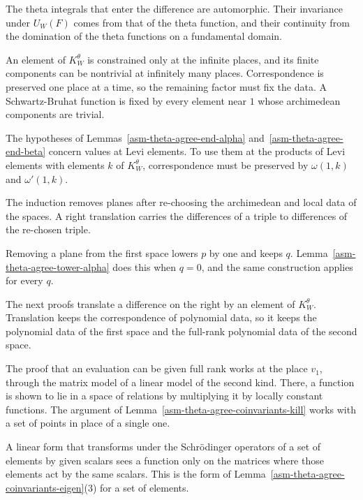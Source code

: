 The theta integrals that enter the difference are automorphic. Their
invariance under $U_W(F)$ comes from that of the theta function, and their
continuity from the domination of the theta functions on a fundamental domain.

An element of $K^\theta_W$ is constrained only at the infinite places, and its
finite components can be nontrivial at infinitely many places. Correspondence
is preserved one place at a time, so the remaining factor must fix the data. A
Schwartz-Bruhat function is fixed by every element near $1$ whose archimedean
components are trivial.

The hypotheses of Lemmas~\ref{asm-theta-agree-end-alpha}
and~\ref{asm-theta-agree-end-beta} concern values at Levi elements. To use them
at the products of Levi elements with elements $k$ of $K^\theta_W$,
correspondence must be preserved by $\omega(1,k)$ and $\omega'(1,k)$.

The induction removes planes after re-choosing the archimedean and local data
of the spaces. A right translation carries the differences of a triple to
differences of the re-chosen triple.

Removing a plane from the first space lowers $p$ by one and keeps $q$.
Lemma~\ref{asm-theta-agree-tower-alpha} does this when $q=0$, and the same
construction applies for every $q$.

The next proofs translate a difference on the right by an element of
$K^\theta_W$. Translation keeps the correspondence of polynomial data, so it
keeps the polynomial data of the first space and the full-rank polynomial data
of the second space.

The proof that an evaluation can be given full rank works at the place $v_1$,
through the matrix model of a linear model of the second kind. There, a function
is shown to lie in a space of relations by multiplying it by locally constant
functions. The argument of Lemma~\ref{asm-theta-agree-coinvariants-kill} works
with a set of points in place of a single one.

A linear form that transforms under the Schrödinger operators of a set of
elements by given scalars sees a function only on the matrices where those
elements act by the same scalars. This is the form of
Lemma~\ref{asm-theta-agree-coinvariants-eigen}(3) for a set of elements.


